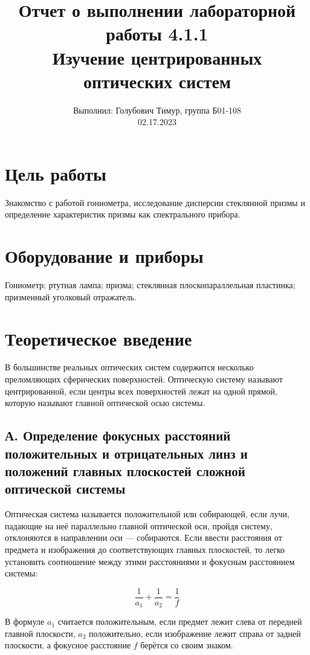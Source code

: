 \documentclass[12pt,a4paper]{article}
\author{\normalsize Выполнил: Голубович Тимур, группа Б01-108 \\
    	\normalsize 02.17.2023}
\date{}
\title{
    	\large Отчет о выполнении лабораторной работы 4.1.1 \\
    	\Large Изучение центрированных оптических систем\\ 
    }
\begin{document}
    	\maketitle
    	
    \section*{Цель работы}
    Знакомство с работой гониометра, исследование дисперсии стеклянной призмы и определение характеристик призмы как спектрального прибора.
    
    
    \section*{Оборудование и приборы} 
    Гониометр;
    ртутная лампа;
    призма;
    стеклянная плоскопараллельная пластинка;
    призменный уголковый отражатель.

	
	\section*{Теоретическое введение} 

    В большинстве реальных оптических систем содержится несколько преломляющих сферических поверхностей. Оптическую систему называют центрированной, если центры всех поверхностей лежат на одной прямой, которую называют главной оптической осью системы.
	
	\subsection*{А. Определение фокусных расстояний положительных и отрицательных линз и положений главных плоскостей сложной оптической системы}
	
	Оптическая система называется положительной или собирающей, если лучи, падающие на неё параллельно главной оптической оси, пройдя систему, отклоняются в направлении оси — собираются. Если ввести расстояния от предмета и изображения до соответствующих главных плоскостей, то легко установить соотношение между этими расстояниями и фокусным расстоянием системы:
	
	\begin{equation}
		\frac{1}{a_1} + \frac{1}{a_2} = \frac{1}{f}
        \label{eq:linza}
	\end{equation}

	В формуле $a_1$ считается положительным, если предмет лежит слева от передней главной плоскости, $a_2$ положительно, если изображение лежит справа от задней плоскости, а фокусное расстояние $f$ берётся со своим знаком.
	
\end{document}
